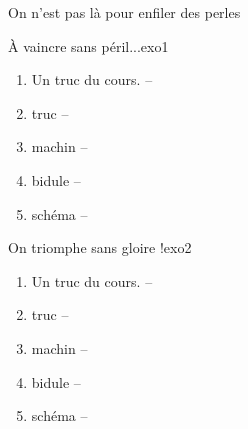 \documentclass[12pt,a4paper]{article}
\begin{document}
\begin{header}
On n'est pas là pour enfiler des perles
\end{header}

\noindent
\rco \app \anarai \rea \val \com

\begin{exo}{À vaincre sans péril...}{exo1}

\begin{enumerate}
\item \rco{} Un truc du cours. -- 

\item \app{} truc -- 

\item \anarai{} \val{} machin --  

\item \app{} \com{} bidule --  

\item \rea{} schéma -- 
\end{enumerate}

\end{exo}

\begin{exo}{On triomphe sans gloire !}{exo2}

\begin{enumerate}
\item \rco{} Un truc du cours. -- 

\item \app{} truc -- 

\item \anarai{} \val{} machin --  

\item \app{} \com{} bidule --  

\item \rea{} schéma -- 
\end{enumerate}

\end{exo}

\makecptces
\end{document}
